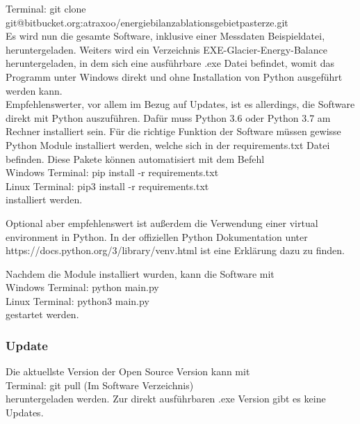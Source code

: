 \documentclass[11pt,a4paper]{article}
\begin{document}
Terminal: \textsf{\small git clone git@bitbucket.org:atraxoo/energiebilanzablationsgebietpasterze.git}\\


Es wird nun die gesamte Software, inklusive einer Messdaten Beispieldatei, heruntergeladen. Weiters wird ein Verzeichnis EXE-Glacier-Energy-Balance heruntergeladen, in dem sich eine ausführbare .exe Datei befindet, womit das Programm unter Windows direkt und ohne Installation von Python ausgeführt werden kann.\\

Empfehlenswerter, vor allem im Bezug auf Updates, ist es allerdings, die Software direkt mit Python auszuführen. Dafür muss Python 3.6 oder Python 3.7 am Rechner installiert sein. Für die richtige Funktion der Software müssen gewisse Python Module installiert werden, welche sich in der requirements.txt Datei befinden. Diese Pakete können automatisiert mit dem Befehl\\

Windows Terminal: \textsf{\small pip install -r requirements.txt}\\
Linux Terminal:  \textsf{\small pip3 install -r requirements.txt}\\

installiert werden.

Optional aber empfehlenswert ist außerdem die Verwendung einer virtual environment in Python. In der offiziellen Python Dokumentation unter \textsf{\small https://docs.python.org/3/library/venv.html} ist eine Erklärung dazu zu finden.

Nachdem die Module installiert wurden, kann die Software mit \\

Windows Terminal: \textsf{\small python main.py}\\
Linux Terminal: \textsf{\small python3 main.py}\\

gestartet werden.

\subsubsection{Update}
Die aktuellste Version der Open Source Version kann mit \\

Terminal: \textsf{\small git pull} (Im Software Verzeichnis)\\

heruntergeladen werden. Zur direkt ausführbaren .exe Version gibt es keine Updates.
\end{document}
